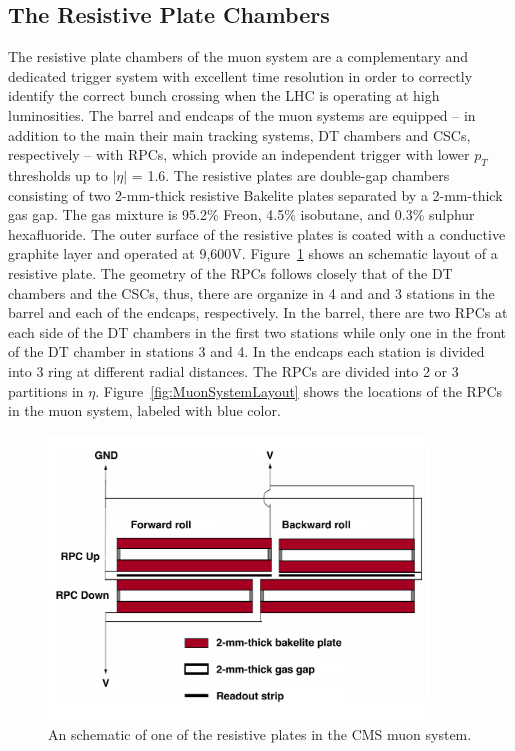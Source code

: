 \subsection{The Resistive Plate Chambers}
The resistive plate chambers of the muon system are a complementary
and dedicated trigger system with excellent time resolution in order
to correctly identify the correct bunch crossing when the LHC is
operating at high luminosities. The barrel and endcaps of the muon
systems are equipped -- in addition to the main their main tracking
systems, DT chambers and CSCs, respectively -- with RPCs, which
provide an independent trigger with lower $p_{T}$ thresholds up to
$|\eta|$ = 1.6. The resistive plates are double-gap chambers consisting of two
2-mm-thick resistive Bakelite plates separated by a 2-mm-thick gas
gap. The gas mixture is 95.2\% Freon, 4.5\% isobutane, and 0.3\%
sulphur hexafluoride. The outer surface of the resistive plates is
coated with a conductive graphite layer and operated at
9,600\unit{V}. Figure~\ref{fig:rpc} shows an schematic layout of a
resistive plate.
The geometry of the RPCs follows closely that of the DT chambers and
the CSCs, thus, there are organize in 4 and and 3 stations in the
barrel and each of the endcaps, respectively. In the barrel, there are two RPCs at
each side of the DT chambers in the first two stations while only one
in the front of the DT chamber in stations 3 and 4. In the endcaps
each station is divided into 3 ring at different radial distances. The
RPCs are divided into 2 or 3 partitions in $\eta$. Figure~\ref{fig:MuonSystemLayout} shows
the locations of the RPCs in the muon system, labeled with blue color.
\begin{figure}
 \centering
\includegraphics[width=0.9\textwidth]{CMS_DetectorFigures/RPC.pdf}
\caption{An schematic of one of the resistive plates in the CMS muon system.\label{fig:rpc}}
\end{figure}

